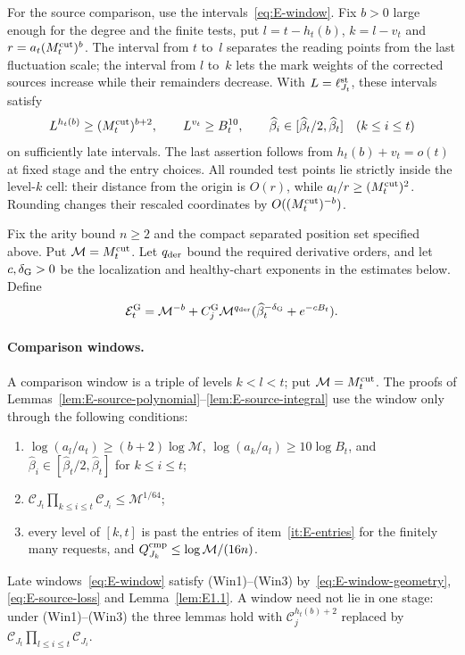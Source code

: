 For the source comparison, use the intervals~\eqref{eq:E-window}. Fix $b>0$ large enough for the degree and the finite tests, put $l=t-h_t(b)$, $k=l-v_t$ and $r=a_t(M^{\mathrm{cut}}_t)^b$. The interval from $t$ to~$l$ separates the reading points from the last fluctuation scale; the interval from $l$ to~$k$ lets the mark weights of the corrected sources increase while their remainders decrease. With $L=\ell_{J_t}^{\rm st}$, these intervals satisfy
\begin{equation}\label{eq:E-window-geometry}
 L^{h_t(b)}\ge(M^{\mathrm{cut}}_t)^{b+2},\qquad
 L^{v_t}\ge B_t^{10},\qquad
 \widehat\beta_i\in[\widehat\beta_t/2,\widehat\beta_t]\quad(k\le i\le t)
\end{equation}
on sufficiently late intervals. The last assertion follows from $h_t(b)+v_t=o(t)$ at fixed stage and the entry choices. All rounded test points lie strictly inside the level-$k$ cell: their distance from the origin is $O(r)$, while $a_l/r\ge(M^{\mathrm{cut}}_t)^2$. Rounding changes their rescaled coordinates by $O((M^{\mathrm{cut}}_t)^{-b})$.

Fix the arity bound $n\ge2$ and the compact separated position set specified above. Put $\mathcal M=M^{\mathrm{cut}}_t$. Let $q_{\rm der}$ bound the required derivative orders, and let $c,\delta_{\rm G}>0$ be the localization and healthy-chart exponents in the estimates below. Define
\begin{equation}\label{eq:E-source-initial}
 \mathcal E_t^{\rm G}=\mathcal M^{-b}
 +C^{\rm G}_j\mathcal M^{q_{\rm der}}
   (\widehat\beta_t^{-\delta_{\rm G}}+e^{-cB_t}).
\end{equation}

\paragraph{Comparison windows.} A comparison window is a triple of levels $k<l<t$; put $\mathcal M=M^{\mathrm{cut}}_t$. The proofs of Lemmas~\ref{lem:E-source-polynomial}--\ref{lem:E-source-integral} use the window only through the following conditions:
\begin{enumerate}
\item[(Win1)] $\log(a_l/a_t)\ge(b+2)\log\mathcal M$, $\log(a_k/a_l)\ge10\log B_t$, and $\widehat\beta_i\in[\widehat\beta_t/2,\widehat\beta_t]$ for $k\le i\le t$;
\item[(Win2)] $\mathcal C_{J_t}\prod_{k\le i\le t}\mathcal C_{J_i}\le\mathcal M^{1/64}$;
\item[(Win3)] every level of $[k,t]$ is past the entries of item~\ref{it:E-entries} for the finitely many requests, and $Q^{\rm cmp}_{J_k}\le\log\mathcal M/(16n)$.
\end{enumerate}
Late windows~\eqref{eq:E-window} satisfy (Win1)--(Win3) by~\eqref{eq:E-window-geometry}, \eqref{eq:E-source-loss} and Lemma~\ref{lem:E1.1}. A window need not lie in one stage: under (Win1)--(Win3) the three lemmas hold with $\mathcal C_j^{h_t(b)+2}$ replaced by $\mathcal C_{J_t}\prod_{l\le i\le t}\mathcal C_{J_i}$.

